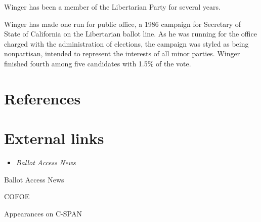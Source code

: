 Winger has been a member of the Libertarian Party for several years.

Winger has made one run for public office, a 1986 campaign for Secretary
of State of California on the Libertarian ballot line. As he was running
for the office charged with the administration of elections, the
campaign was styled as being nonpartisan, intended to represent the
interests of all minor parties. Winger finished fourth among five
candidates with 1.5\% of the vote.

\section{References}\label{references}

\section{External links}\label{external-links}

\begin{itemize}
\item
  \emph{Ballot Access News}
\end{itemize}

Ballot Access News

COFOE

Appearances on C-SPAN
